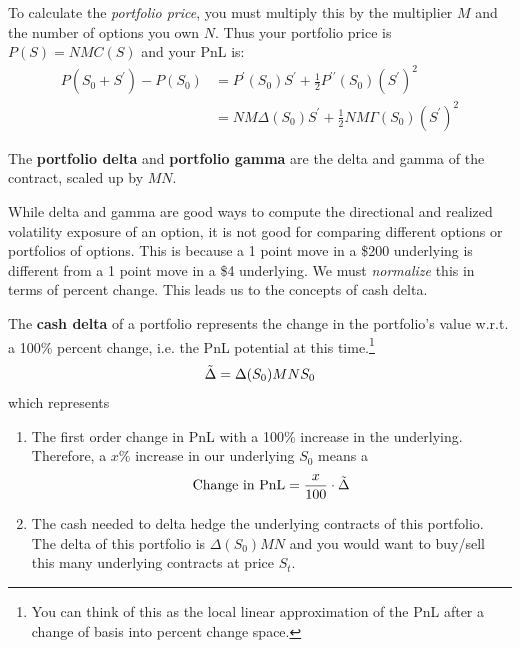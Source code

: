 \documentclass{article}
\begin{document}
    To calculate the \textit{portfolio price}, you must multiply this by the multiplier $M$ and the number of options you own $N$. Thus your portfolio price is $P(S) = N M C(S)$ and your PnL is: 
    \begin{align}
      P(S_0 + S^\prime) - P(S_0) & = P^\prime (S_0) S^\prime + \frac{1}{2} P^{\prime\prime} (S_0) (S^\prime)^2 \\
                                 & = N M \Delta(S_0) S^\prime + \frac{1}{2} N M \Gamma(S_0) (S^\prime)^2
    \end{align}

    \begin{definition}
      \label{def:portfolio-delta-gamma}
      The \textbf{portfolio delta} and \textbf{portfolio gamma} are the delta and gamma of the contract, scaled up by $MN$.
    \end{definition}

    While delta and gamma are good ways to compute the directional and realized volatility exposure of an option, it is not good for comparing different options or portfolios of options. This is because a 1 point move in a \$200 underlying is different from a 1 point move in a \$4 underlying. We must \textit{normalize} this in terms of percent change. This leads us to the concepts of cash delta. 

    \begin{definition}
      \label{def:cash-delta}
      The \textbf{cash delta} of a portfolio represents the change in the portfolio's value w.r.t. a 100\% percent change, i.e. the PnL potential at this time.\footnote{You can think of this as the local linear approximation of the PnL after a change of basis into percent change space. }
      \begin{equation}
        \Tilde{\Delta} = \Delta(S_0) M N S_0 
      \end{equation}
      which represents
      \begin{enumerate}
        \item The first order change in PnL with a 100\% increase in the underlying. Therefore, a $x\%$ increase in our underlying $S_0$ means a
          \begin{equation}
            \text{Change in PnL} = \frac{x}{100} \cdot \Tilde{\Delta}
          \end{equation}
        \item The cash needed to delta hedge the underlying contracts of this portfolio. The delta of this portfolio is $\Delta(S_0) M N$ and you would want to buy/sell this many underlying contracts at price $S_t$.
      \end{enumerate}
    \end{definition}
\end{document}
